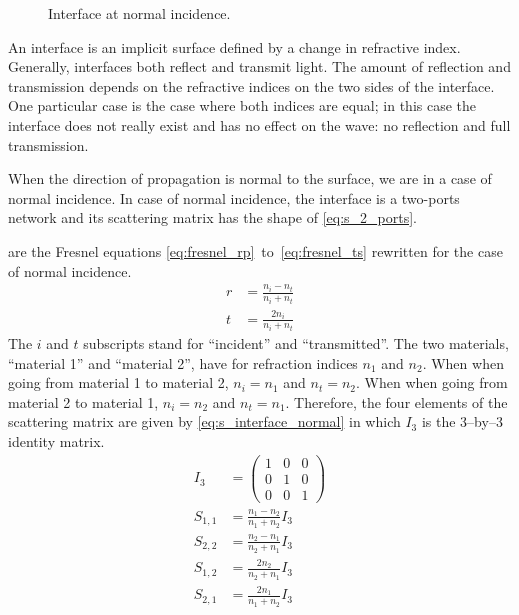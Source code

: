 \begin{figure}[hbtp]
    \centering
    \caption{\label{fig:net_interface_normal}Interface at normal incidence.}
\end{figure}
An interface is an implicit surface defined by a change in refractive index.
Generally, interfaces both reflect and transmit light.
The amount of reflection and transmission depends on the refractive indices on the two sides of the interface.
One particular case is the case where both indices are equal; in this case the interface does not really exist and has no effect on the wave: no reflection and full transmission.

When the direction of propagation is normal to the surface, we are in a case of normal incidence.
In case of normal incidence, the interface is a two-ports network and its scattering matrix has the shape of \cref{eq:s_2_ports}.

 are the Fresnel equations \eqref{eq:fresnel_rp}~to~\eqref{eq:fresnel_ts} rewritten for the case of normal incidence.
\begin{subequations}
    \begin{align}
        r &= \frac{n_i - n_t}{n_i + n_t} \label{eq:fresnel_normal_r}\\
        t &= \frac{2 n_i}{n_i + n_t} \label{eq:fresnel_normal_t}
    \end{align}
    \label{eq:fresnel_normal}
\end{subequations}
The $i$ and $t$ subscripts stand for ``incident'' and ``transmitted''.
The two materials, ``material 1'' and ``material 2'', have for refraction indices $n_1$ and $n_2$.
When when going from material 1 to material 2, $n_i = n_1$ and $n_t = n_2$.
When when going from material 2 to material 1, $n_i = n_2$ and $n_t = n_1$.
Therefore, the four elements of the scattering matrix are given by \cref{eq:s_interface_normal} in which $I_3$ is the 3--by--3 identity matrix.
\begin{subequations}
    \begin{align}
        I_3 &= \begin{pmatrix} 1&0&0\\0&1&0\\0&0&1 \end{pmatrix}
        \\
        S_{1, 1} &= \frac{n_1 - n_2}{n_1 + n_2} I_3
        \\
        S_{2, 2} &= \frac{n_2 - n_1}{n_2 + n_1} I_3
        \\
        S_{1, 2} &= \frac{2 n_2}{n_2 + n_1} I_3
        \\
        S_{2, 1} &= \frac{2 n_1}{n_1 + n_2} I_3
    \end{align}
    \label{eq:s_interface_normal}
\end{subequations}

